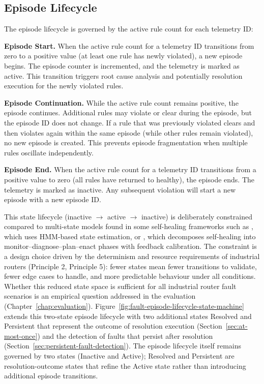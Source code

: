 \subsection{Episode Lifecycle}\label{sec:episode-lifecycle}

The episode lifecycle is governed by the active rule count for each telemetry ID:

\textbf{Episode Start.} When the active rule count for a telemetry ID transitions from zero to a positive value (at least one rule has newly violated), a new episode begins. The episode counter is incremented, and the telemetry is marked as active. This transition triggers root cause analysis and potentially resolution execution for the newly violated rules.

\textbf{Episode Continuation.} While the active rule count remains positive, the episode continues. Additional rules may violate or clear during the episode, but the episode ID does not change. If a rule that was previously violated clears and then violates again within the same episode (while other rules remain violated), no new episode is created. This prevents episode fragmentation when multiple rules oscillate independently.

\textbf{Episode End.} When the active rule count for a telemetry ID transitions from a positive value to zero (all rules have returned to healthy), the episode ends. The telemetry is marked as inactive. Any subsequent violation will start a new episode with a new episode ID.

This state lifecycle (inactive $\rightarrow$ active $\rightarrow$ inactive) is deliberately constrained compared to multi-state models found in some self-healing frameworks such as \cite{ref19}, which uses HMM-based state estimation, or \cite{ref21}, which decomposes self-healing into monitor--diagnose--plan--enact phases with feedback calibration. The constraint is a design choice driven by the determinism and resource requirements of industrial routers (Principle 2, Principle 5): fewer states mean fewer transitions to validate, fewer edge cases to handle, and more predictable behaviour under all conditions. Whether this reduced state space is sufficient for all industrial router fault scenarios is an empirical question addressed in the evaluation (Chapter~\ref{chap:evaluation}). Figure~\ref{fig:fault-episode-lifecycle-state-machine} extends this two-state episode lifecycle with two additional states Resolved and Persistent that represent the outcome of resolution execution (Section~\ref{sec:at-most-once}) and the detection of faults that persist after resolution (Section~\ref{sec:persistent-fault-detection}). The episode lifecycle itself remains governed by two states (Inactive and Active); Resolved and Persistent are resolution-outcome states that refine the Active state rather than introducing additional episode transitions.

